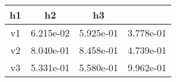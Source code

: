 \begin{tabular}{c|c|c|c}
\hline
\hline
h1 & h2 & h3 \\ 
\hline
v1 & 6.215e-02 & 5.925e-01 & 3.778e-01 \\ 
v2 & 8.040e-01 & 8.458e-01 & 4.739e-01 \\ 
v3 & 5.331e-01 & 5.580e-01 & 9.962e-01 \\ 
\hline
\hline
\end{tabular}

